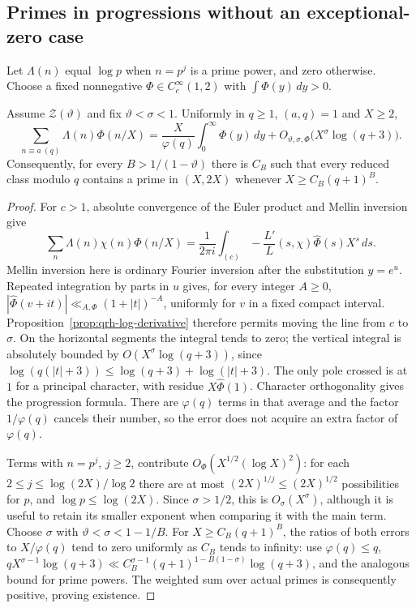 \subsection{Primes in progressions without an exceptional-zero case}

Let $\Lambda(n)$ equal $\log p$ when $n=p^j$ is a prime
power, and zero otherwise. Choose a fixed nonnegative
$\Phi\in C_c^\infty(1,2)$ with $\int\Phi(y)\,dy>0$.

\begin{proposition}
\label{prop:qrh-smooth-primes}
Assume $\mathcal Z(\vartheta)$ and fix
$\vartheta<\sigma<1$. Uniformly in $q\ge1$, $(a,q)=1$
and $X\ge2$,
\[
 \sum_{n\equiv a\ (q)}\Lambda(n)\Phi(n/X)
 =\frac{X}{\varphi(q)}\int_0^\infty\Phi(y)\,dy
   +O_{\vartheta,\sigma,\Phi}
      \bigl(X^\sigma\log(q+3)\bigr).
\]
Consequently, for every $B>1/(1-\vartheta)$ there is
$C_B$ such that every reduced class modulo $q$ contains
a prime in $(X,2X)$ whenever $X\ge C_B(q+1)^B$.
\end{proposition}
\begin{proof}
For $c>1$, absolute convergence of the Euler product and
Mellin inversion give
\[
 \sum_n\Lambda(n)\chi(n)\Phi(n/X)
 =\frac1{2\pi i}\int_{(c)}
    -\frac{L'}L(s,\chi)\widehat\Phi(s)X^s\,ds.
\]
Mellin inversion here is ordinary Fourier inversion after
the substitution $y=e^u$. Repeated integration by parts in
$u$ gives, for every integer $A\ge0$,
$|\widehat\Phi(v+it)|\ll_{A,\Phi}(1+|t|)^{-A}$,
uniformly for $v$ in a fixed compact interval.
Proposition~\ref{prop:qrh-log-derivative} therefore permits
moving the line from $c$ to $\sigma$. On the horizontal
segments the integral tends to zero; the vertical integral
is absolutely bounded by
$O(X^\sigma\log(q+3))$, since
$\log(q(|t|+3))\le\log(q+3)+\log(|t|+3)$.
The only pole crossed is at $1$ for a principal character,
with residue $X\widehat\Phi(1)$.
Character orthogonality gives the progression formula.
There are $\varphi(q)$ terms in that average and the factor
$1/\varphi(q)$ cancels their number, so the error does not
acquire an extra factor of $\varphi(q)$.

Terms with $n=p^j$, $j\ge2$, contribute
$O_\Phi(X^{1/2}(\log X)^2)$: for each
$2\le j\le\log(2X)/\log2$ there are at most
$(2X)^{1/j}\le(2X)^{1/2}$ possibilities for $p$, and
$\log p\le\log(2X)$. Since $\sigma>1/2$, this is $O_\sigma(X^\sigma)$,
although it is useful to retain its smaller exponent when
comparing it with the main term.
Choose $\sigma$ with $\vartheta<\sigma<1-1/B$.
For $X\ge C_B(q+1)^B$, the ratios of both errors to
$X/\varphi(q)$ tend to zero uniformly as $C_B$ tends
to infinity: use $\varphi(q)\le q$,
$qX^{\sigma-1}\log(q+3)\ll
 C_B^{\sigma-1}(q+1)^{1-B(1-\sigma)}\log(q+3)$,
and the analogous bound for prime powers.
The weighted sum over actual primes is consequently
positive, proving existence.
\end{proof}


